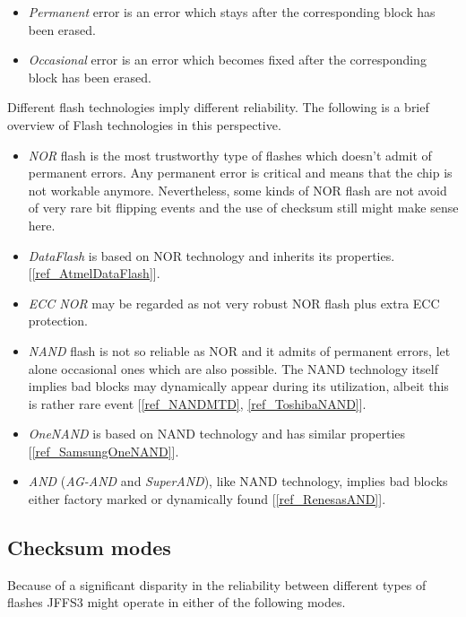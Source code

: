 \documentclass[12pt,a4paper,oneside,titlepage]{article}
\begin{document}
\begin{itemize}
\item \emph{Permanent} error is an error which stays after the corresponding block has
been erased.

\item \emph{Occasional} error is an error which becomes fixed after the corresponding
block has been erased.
\end{itemize}

Different flash technologies imply different reliability. The following
is a brief overview of Flash technologies in this perspective.

\begin{itemize}
\item \emph{NOR}
flash is the most trustworthy type of flashes which doesn't admit of permanent
errors. Any permanent error is critical and means that the chip is not workable anymore.
Nevertheless, some kinds of NOR flash are not avoid of very rare bit flipping
events and the use of checksum still might make sense here.

\item \emph{DataFlash} is based on NOR technology and inherits its properties.
[\ref{ref_AtmelDataFlash}].

\item \emph{ECC NOR} may be regarded as not very robust NOR flash plus extra ECC
protection.

\item \emph{NAND} flash is not so reliable as NOR and it admits of permanent errors, let
alone occasional ones which are also possible. The NAND technology itself
implies bad blocks may dynamically appear during its utilization, albeit this is
rather rare event [\ref{ref_NANDMTD}, \ref{ref_ToshibaNAND}].

\item \emph{OneNAND} is based on NAND technology and has similar properties
[\ref{ref_SamsungOneNAND}].

\item \emph{AND} (\emph{AG-AND} and \emph{SuperAND}),
like NAND technology, implies bad blocks either factory marked
or dynamically found [\ref{ref_RenesasAND}].
\end{itemize}

%
%
\subsection{Checksum modes}
Because of a significant disparity in the reliability between different types of
flashes JFFS3 might operate in either of the following modes.
\end{document}
